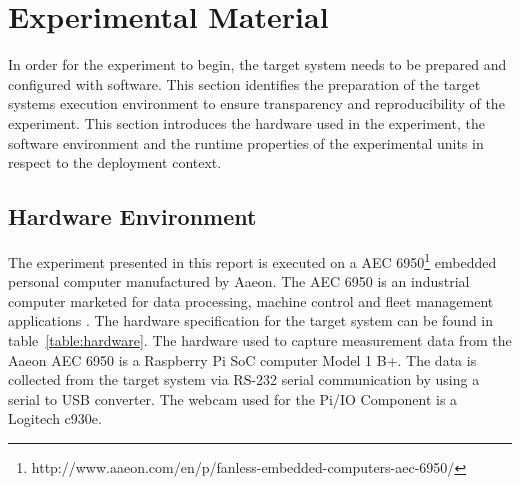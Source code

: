


\section{Experimental Material}
\label{section:exp-material}
In order for the experiment to begin, the target system needs to be prepared and configured with software. This section identifies the preparation of the target systems execution environment to ensure transparency and reproducibility of the experiment. This section introduces the hardware used in the experiment, the software environment and the runtime properties of the experimental units in respect to the deployment context. 

\subsection{Hardware Environment}
\label{section:hw-env}
The experiment presented in this report is executed on a AEC 6950\footnote{http://www.aaeon.com/en/p/fanless-embedded-computers-aec-6950/} embedded personal computer manufactured by Aaeon. The AEC 6950 is an industrial computer marketed for data processing, machine control and fleet management applications \cite{aaeon}. The hardware specification for the target system can be found in table~\ref{table:hardware}. The hardware used to capture measurement data from the Aaeon AEC 6950 is a Raspberry Pi SoC \cite{raspberry} computer Model 1 B+. The data is collected from the target system via RS-232 serial communication by using a serial to USB converter. The webcam used for the Pi/IO Component is a Logitech c930e.

